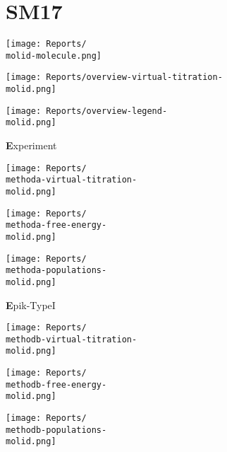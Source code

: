\documentclass[9pt]{standalone}
\begin{document}
\newcommand{\molid}{SM17}
\newcommand{\methoda}{Experiment}
\newcommand{\methodb}{Epik-TypeI}
\newcommand{\methodc}{Jaguar-TypeI}
\newcommand{\methodd}{Epik-TypeII}
\newcommand{\methode}{Epik-TypeIII}
\section{\molid}
\noindent 
\begin{minipage}[s]{0.35\textwidth}\centering
\texttt{[image: Reports/\\molid-molecule.png]}
\end{minipage}
\begin{minipage}[s]{0.35\textwidth}
\texttt{[image: Reports/overview-virtual-titration-\\molid.png]}
\end{minipage}
\begin{minipage}[s]{0.23\textwidth}
\texttt{[image: Reports/overview-legend-\\molid.png]}
\end{minipage}

\begin{minipage}[s]{\textwidth}\centering
{\textbf \methoda}
\end{minipage}

\noindent
\begin{minipage}[s]{0.33\textwidth}\centering
\texttt{[image: Reports/\\methoda-virtual-titration-\\molid.png]}
\end{minipage}
\begin{minipage}[s]{0.33\textwidth}
\texttt{[image: Reports/\\methoda-free-energy-\\molid.png]}
\end{minipage}
\begin{minipage}[s]{0.33\textwidth}
\texttt{[image: Reports/\\methoda-populations-\\molid.png]}
\end{minipage}

\begin{minipage}[s]{\textwidth}\centering
{\textbf \methodb}
\end{minipage}

\noindent
\begin{minipage}[s]{0.33\textwidth}\centering
\texttt{[image: Reports/\\methodb-virtual-titration-\\molid.png]}
\end{minipage}
\begin{minipage}[s]{0.33\textwidth}
\texttt{[image: Reports/\\methodb-free-energy-\\molid.png]}
\end{minipage}
\begin{minipage}[s]{0.33\textwidth}
\texttt{[image: Reports/\\methodb-populations-\\molid.png]}
\end{minipage}
\end{document}
